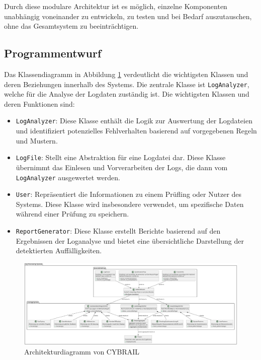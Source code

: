 Durch diese modulare Architektur ist es möglich, einzelne Komponenten unabhängig voneinander zu entwickeln, zu testen und bei Bedarf auszutauschen, ohne das Gesamtsystem zu beeinträchtigen.

\subsection{Programmentwurf}

Das Klassendiagramm in Abbildung \ref{fig:architekturdiagramm} verdeutlicht die wichtigsten Klassen und deren Beziehungen innerhalb des Systems. 
Die zentrale Klasse ist \texttt{LogAnalyzer}, welche für die Analyse der Logdaten zuständig ist. 
Die wichtigsten Klassen und deren Funktionen sind:

\begin{itemize} 
\item \texttt{LogAnalyzer}: Diese Klasse enthält die Logik zur Auswertung der Logdateien und identifiziert potenzielles Fehlverhalten basierend auf vorgegebenen Regeln und Mustern. 
\item \texttt{LogFile}: Stellt eine Abstraktion für eine Logdatei dar.
Diese Klasse übernimmt das Einlesen und Vorverarbeiten der Logs, die dann vom \texttt{LogAnalyzer} ausgewertet werden. 
\item \texttt{User}: Repräsentiert die Informationen zu einem Prüfling oder Nutzer des Systems. 
Diese Klasse wird insbesondere verwendet, um spezifische Daten während einer Prüfung zu speichern. 
\item \texttt{ReportGenerator}: Diese Klasse erstellt Berichte basierend auf den Ergebnissen der Loganalyse und bietet eine übersichtliche Darstellung der detektierten Auffälligkeiten. 
\end{itemize}

\begin{landscape}
\begin{figure}[h]
    \centering
    \includegraphics[width=1.5\textwidth]{figures/CybrailClassdiagramm.pdf}
    \caption{Architekturdiagramm von CYBRAIL}
    \label{fig:architekturdiagramm}
\end{figure}
\end{landscape}

